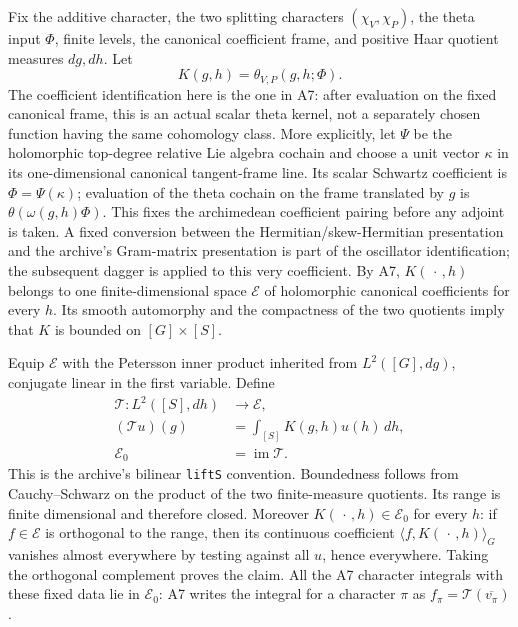 \documentclass[11pt]{article}
\theoremstyle{definition}\newtheorem{definition}[theorem]{Definition}\newtheorem{remark}[theorem]{Remark}
\begin{document}
Fix the additive character, the two splitting characters
$(\chi_V,\chi_P)$, the theta input $\Phi$, finite levels, the
canonical coefficient frame, and positive Haar quotient measures
$dg,dh$. Let
\[
 K(g,h)=\theta_{V,P}(g,h;\Phi).
\]
The coefficient identification here is the one in A7: after
evaluation on the fixed canonical frame, this is an actual scalar
theta kernel, not a separately chosen function having the same
cohomology class. More explicitly, let $\Psi$ be the holomorphic
top-degree relative Lie algebra cochain and choose a unit vector
$\kappa$ in its one-dimensional canonical tangent-frame line.
Its scalar Schwartz coefficient is $\Phi=\Psi(\kappa)$; evaluation
of the theta cochain on the frame translated by $g$ is
$\theta(\omega(g,h)\Phi)$. This fixes the archimedean coefficient
pairing before any adjoint is taken. A fixed conversion between
the Hermitian/skew-Hermitian presentation and the archive's
Gram-matrix presentation is part of the oscillator identification;
the subsequent dagger is applied to this very coefficient.
By A7, $K(\,\cdot\,,h)$ belongs to one
finite-dimensional space $\mathcal E$ of holomorphic canonical
coefficients for every $h$. Its smooth automorphy and the
compactness of the two quotients imply that $K$ is bounded on
$[G]\times[S]$.

Equip $\mathcal E$ with the Petersson inner product inherited from
$L^2([G],dg)$, conjugate linear in the first variable. Define
\begin{equation}
\begin{aligned}
 \mathcal T:L^2([S],dh)&\longrightarrow\mathcal E,\\
 (\mathcal T u)(g)&=\int_{[S]}K(g,h)u(h)\,dh,\\
 \mathcal E_0&=\operatorname{im}\mathcal T.
\end{aligned}
\tag{B17a}
\end{equation}
This is the archive's bilinear \texttt{liftS} convention. Boundedness
follows from Cauchy--Schwarz on the product of the two finite-measure
quotients. Its range is finite dimensional and therefore closed.
Moreover $K(\,\cdot\,,h)\in\mathcal E_0$ for every $h$:
if $f\in\mathcal E$ is orthogonal to the range, then its
continuous coefficient $\langle f,K(\,\cdot\,,h)\rangle_G$
vanishes almost everywhere by testing against all $u$, hence
everywhere. Taking the orthogonal complement proves the claim.
All the A7 character integrals with these fixed data lie in
$\mathcal E_0$: A7 writes the integral for a character $\pi$ as
$f_\pi=\mathcal T(\overline{v_\pi})$.
\end{document}
